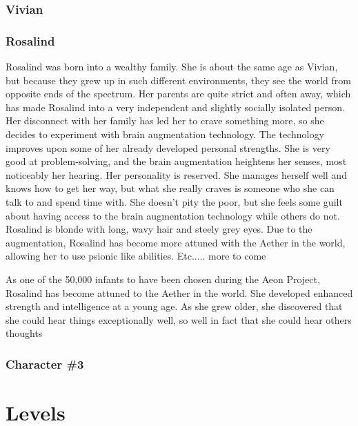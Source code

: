 \documentclass[12pt,titlepage]{article}
\newcommand\tab[1][.5in]{\hspace*{#1}}
\begin{document}
\subsubsection{Vivian}


\subsubsection{Rosalind}
\tab Rosalind was born into a wealthy family. She is about the same age as Vivian, 
but because they grew up in such different environments, they see the world from 
opposite ends of the spectrum. Her parents are quite strict and often away, which 
has made Rosalind into a very independent and slightly socially isolated person. 
Her disconnect with her family has led her to crave something more, so she 
decides to experiment with brain augmentation technology. The technology 
improves upon some of her already developed personal strengths. She is very 
good at problem-solving, and the brain augmentation heightens her senses, most 
noticeably her hearing. Her personality is reserved. She manages herself well and 
knows how to get her way, but what she really craves is someone who she can 
talk to and spend time with. She doesn't pity the poor, but she feels some guilt 
about having access to the brain augmentation technology while others do not. 
Rosalind is blonde with long, wavy hair and steely grey eyes. Due to the 
augmentation, Rosalind has become more attuned with the Aether in the world, 
allowing her to use psionic like abilities. Etc..... more to come

As one of the 50,000 infants to have been chosen during the Aeon Project, 
Rosalind has become attuned to the Aether in the world. She developed enhanced 
strength and intelligence at a young age. As she grew older, she discovered that 
she could hear things exceptionally well, so well in fact that she could hear others 
thoughts

\subsubsection{Character \#3}

\newpage
\section{Levels}
\end{document}

